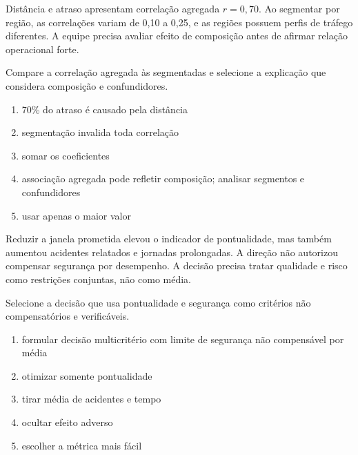 
\TextoBase

Distância e atraso apresentam correlação agregada $r=0,70$. Ao segmentar por região, as correlações variam de 0,10 a 0,25, e as regiões possuem perfis de tráfego diferentes. A equipe precisa avaliar efeito de composição antes de afirmar relação operacional forte.

\FonteDidatica

\Comando Compare a correlação agregada às segmentadas e selecione a explicação que considera composição e confundidores.

\begin{enumerate}[label=\Alph*)]

\item 70\% do atraso é causado pela distância

\item segmentação invalida toda correlação

\item somar os coeficientes

\item associação agregada pode refletir composição; analisar segmentos e confundidores

\item usar apenas o maior valor

\end{enumerate}


\TextoBase

Reduzir a janela prometida elevou o indicador de pontualidade, mas também aumentou acidentes relatados e jornadas prolongadas. A direção não autorizou compensar segurança por desempenho. A decisão precisa tratar qualidade e risco como restrições conjuntas, não como média.

\FonteDidatica

\Comando Selecione a decisão que usa pontualidade e segurança como critérios não compensatórios e verificáveis.

\begin{enumerate}[label=\Alph*)]

\item formular decisão multicritério com limite de segurança não compensável por média

\item otimizar somente pontualidade

\item tirar média de acidentes e tempo

\item ocultar efeito adverso

\item escolher a métrica mais fácil

\end{enumerate}

